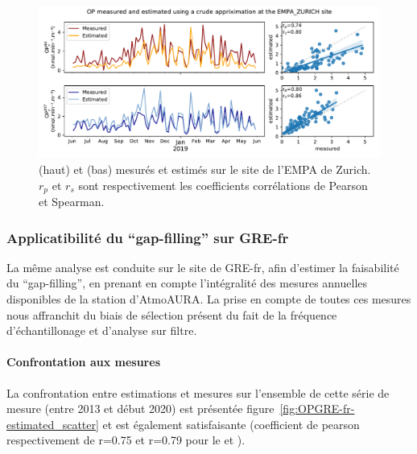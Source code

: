 \begin{figure}[ht]
    \centering
    \includegraphics[width=1.0\linewidth]{figures/chapter05/pyopestimator_EMPA_ZURICH.pdf}
    \caption{\POAAv{} (haut) et \PODTTv{} (bas) mesurés et estimés sur le site de l'EMPA
    de Zurich. $r_p$ et $r_s$ sont respectivement les coefficients corrélations de Pearson
et Spearman.}
    \label{fig:figures/chapter05/pyopestimator_EMPA_ZURICH}
\end{figure}

%  

\subsubsection{Applicatibilité du ``gap-filling'' sur GRE-fr}

La même analyse est conduite sur le site de GRE-fr, afin d'estimer la faisabilité du
``gap-filling'', en prenant en compte l'intégralité des mesures annuelles disponibles de
la station d'AtmoAURA. La prise en compte de toutes ces mesures nous affranchit du biais
de sélection présent du fait de la fréquence d'échantillonage et d'analyse sur filtre.

\paragraph{Confrontation aux mesures}%
\label{par:confrontation_aux_mesures}

La confrontation entre estimations et mesures sur l'ensemble de cette série de mesure
(entre 2013 et début 2020) est présentée figure~\ref{fig:OPGRE-fr-estimated_scatter} et
est également satisfaisante (coefficient de pearson respectivement de r=0.75 et r=0.79 pour
le \POAAv{} et \PODTTv).

